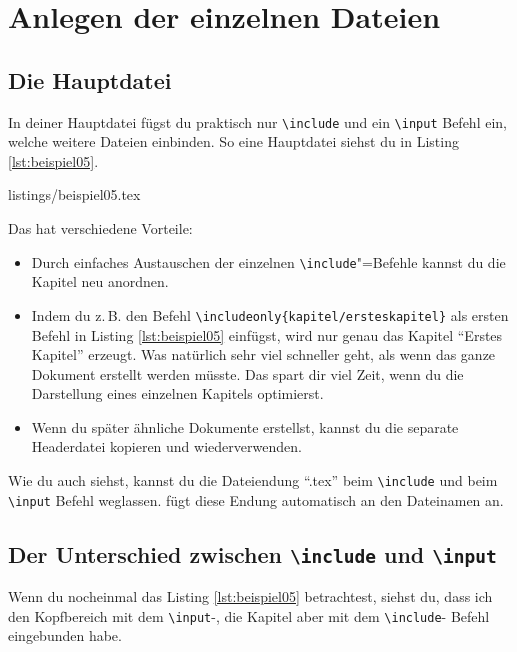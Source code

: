 \section{Anlegen der einzelnen Dateien}

\subsection{Die Hauptdatei}

In deiner Hauptdatei fügst du praktisch nur \texttt{\textbackslash include} und ein \texttt{\textbackslash input} Befehl ein, welche weitere Dateien einbinden. So eine Hauptdatei siehst du in Listing \ref{lst:beispiel05}.

%
	{listings/beispiel05.tex}

Das hat verschiedene Vorteile:

\begin{itemize}
	\item Durch einfaches Austauschen der einzelnen \texttt{\textbackslash include}"=Befehle kannst du die Kapitel neu anordnen.
	\item Indem du z.\,B. den Befehl \texttt{\textbackslash includeonly\{kapitel/ersteskapitel\}} als ersten Befehl in Listing \ref{lst:beispiel05} einfügst, wird nur genau das Kapitel \enquote{Erstes Kapitel} erzeugt. Was natürlich sehr viel schneller geht, als wenn das ganze Dokument erstellt werden müsste. Das spart dir viel Zeit, wenn du die Darstellung eines einzelnen Kapitels optimierst.
	\item Wenn du später ähnliche Dokumente erstellst, kannst du die separate Headerdatei kopieren und wiederverwenden.
\end{itemize}

Wie du auch siehst, kannst du die Dateiendung \enquote{.tex} beim \texttt{\textbackslash include} und beim \texttt{\textbackslash input} Befehl weglassen. \DMLLaTeX{} fügt diese Endung automatisch an den Dateinamen an.

\subsection{Der Unterschied zwischen \texttt{\textbackslash include} und \texttt{\textbackslash input}}

Wenn du nocheinmal das Listing \ref{lst:beispiel05} betrachtest, siehst du, dass ich den Kopfbereich mit dem \texttt{\textbackslash input}-, die Kapitel aber mit dem \texttt{\textbackslash include}- Befehl eingebunden habe.

